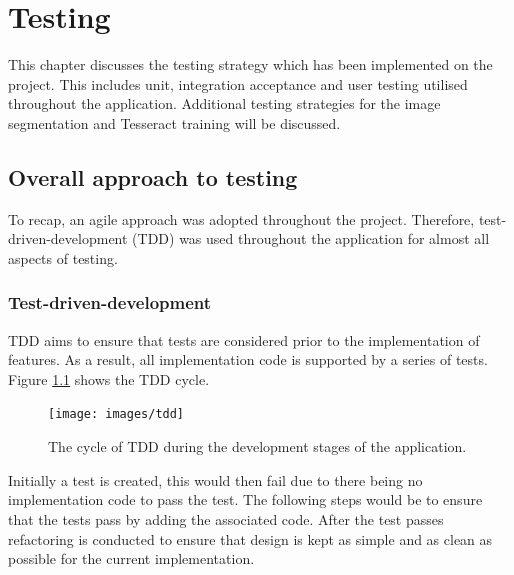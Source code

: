 \chapter{Testing}




This chapter discusses the testing strategy which has been implemented on the project. This includes unit, integration acceptance and user testing utilised throughout the application. Additional testing strategies for the image segmentation and Tesseract training will be discussed.

\section{Overall approach to testing}
To recap, an agile approach was adopted throughout the project. Therefore, test-driven-development (TDD) was used throughout the application for almost all aspects of testing.

\subsection{Test-driven-development}
TDD aims to ensure that tests are considered prior to the implementation of features. As a result, all implementation code is supported by a series of tests. Figure \ref{fig:tdd} shows the TDD cycle.

\begin{figure}
  \texttt{[image: images/tdd]}
  \centering
  \caption{The cycle of TDD during the development stages of the application.}
  \label{fig:tdd}
\end{figure}

Initially a test is created, this would then fail due to there being no implementation code to pass the test. The following steps would be to ensure that the tests pass by adding the associated code. After the test passes refactoring is conducted to ensure that design is kept as simple and as clean as possible for the current implementation.

